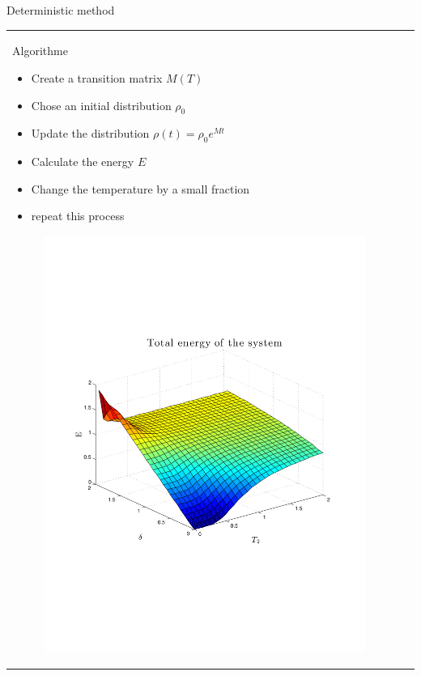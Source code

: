 \begin{frame}{Deterministic method}
\vspace{-1.5cm}
    	\begin{tabular}{l l}
    	  	\begin{minipage}{0.5\textwidth}
    	  	\begin{block}{Algorithme }
    	  	     	  		\begin{itemize}
    	  	     	  		\item Create  a transition matrix  $M(T)$
    	  	     	  		\item Chose an initial distribution  $\rho_0$
    	  	     	  		\item Update the distribution  $ \rho(t) = \rho_0 e^{Mt}$
    	  	     	  		\item Calculate the energy $E$
    	  	     	  		\item Change the temperature by a small fraction
    	  	     	  		\item repeat this process
    	  	     	 \end{itemize}
    	  	\end{block}
    	  	\end{minipage}
    	  	\begin{minipage}{0.6\textwidth}
    	  			\begin{block}{}
    	  				\begin{figure}
    	  						\centering
    	  						\includegraphics[width=\textwidth]{../src/plot/discreteSystems/TotalEnergyFunctionOfT2.pdf}

\end{figure}
\end{block}
\end{minipage}
\end{tabular}
\end{frame}
